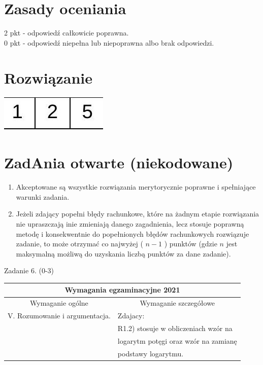 \documentclass[10pt]{article}
\begin{document}
\section*{Zasady oceniania}
2 pkt - odpowiedź całkowicie poprawna.\\
0 pkt - odpowiedź niepełna lub niepoprawna albo brak odpowiedzi.

\section*{Rozwiązanie}
\begin{center}
\includegraphics[max width=\textwidth]{2025_02_07_36131546116d12814c9cg-04}
\end{center}

\section*{ZadAnia otwarte (niekodowane)}
\begin{enumerate}
  \item Akceptowane są wszystkie rozwiązania merytorycznie poprawne i spełniające warunki zadania.
  \item Jeżeli zdający popełni błędy rachunkowe, które na żadnym etapie rozwiązania nie upraszczają inie zmieniają danego zagadnienia, lecz stosuje poprawną metodę i konsekwentnie do popełnionych błędów rachunkowych rozwiązuje zadanie, to może otrzymać co najwyżej ( $n-1$ ) punktów (gdzie $n$ jest maksymalną możliwą do uzyskania liczbą punktów za dane zadanie).
\end{enumerate}

Zadanie 6. (0-3)

\begin{center}
\begin{tabular}{|c|l|}
\hline
\multicolumn{2}{|c|}{Wymagania egzaminacyjne 2021} \\
\hline
\multicolumn{1}{|c|}{Wymaganie ogólne} & \multicolumn{1}{c|}{Wymaganie szczegółowe} \\
\hline
V. Rozumowanie i argumentacja. & Zdajacy: \\
 & R1.2) stosuje w obliczeniach wzór na \\
 & logarytm potęgi oraz wzór na zamianę \\
 & podstawy logarytmu. \\
\hline
\end{tabular}
\end{center}
\end{document}
